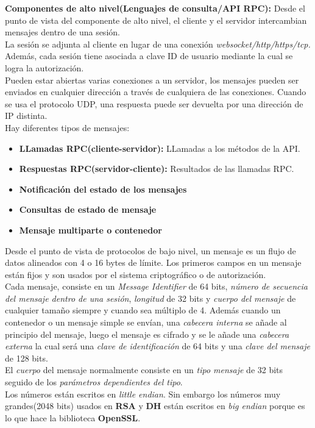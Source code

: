 \begin{description}
	\item \textbf{Componentes de alto nivel(Lenguajes de consulta/API RPC):}
Desde el punto de vista del componente de alto nivel, el cliente y el servidor intercambian mensajes dentro de una sesión.\\
La sesión se adjunta al cliente en lugar de una conexión \emph{websocket/http/https/tcp.} 
Además, cada sesión tiene asociada a clave ID de usuario mediante la cual se logra la autorización.\\ 
Pueden estar abiertas varias conexiones a un servidor, los mensajes pueden ser enviados en cualquier dirección a través de cualquiera de las conexiones.
Cuando se usa el protocolo UDP, una respuesta puede ser devuelta por una dirección de IP distinta.\\
Hay diferentes tipos de mensajes:
\begin{itemize}
		\item \textbf{LLamadas RPC(cliente-servidor):} LLamadas a los métodos de la API.
		\item \textbf{Respuestas RPC(servidor-cliente):} Resultados de las llamadas RPC.
		\item \textbf{Notificación del estado de los mensajes}
		\item \textbf{Consultas de estado de mensaje}
		\item \textbf{Mensaje multiparte o contenedor}
\end{itemize}
Desde el punto de vista de protocolos de bajo nivel, un mensaje es un flujo de datos alineados con 4 o 16 bytes de límite.
Los primeros campos en un mensaje están fijos y son usados por el sistema criptográfico o de autorización.\\
Cada mensaje, consiste en un \emph{Message Identifier} de 64 bits, \emph{número de secuencia del mensaje dentro de una sesión}, \emph{longitud} de 32 bits y \emph{cuerpo del mensaje} de cualquier tamaño siempre y cuando sea múltiplo de 4. 
Además cuando un contenedor o un mensaje simple se envían, una \emph{cabecera interna} se añade al principio del mensaje, luego el mensaje es cifrado y se le añade una \emph{cabecera externa} la cual será una \emph{clave de identificación} de 64 bits y una \emph{clave del mensaje} de 128 bits.\\
El \emph{cuerpo} del mensaje normalmente consiste en un \emph{tipo mensaje} de 32 bits seguido de los \emph{parámetros dependientes del tipo}.\\
Los números están escritos en \emph{little endian}. Sin embargo los números muy grandes(2048 bits) usados en \textbf{RSA} y \textbf{DH} están escritos en \emph{big endian} porque es lo que hace la biblioteca \textbf{OpenSSL}.

\end{description}
